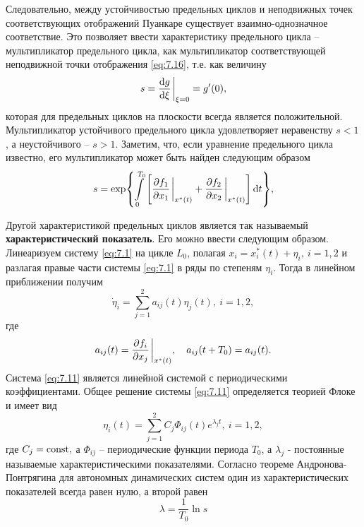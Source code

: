 Следовательно, между устойчивостью предельных циклов и
неподвижных точек соответствующих отображений Пуанкаре существует
взаимно-однозначное соответствие. Это позволяет ввести характеристику
предельного цикла -- мультипликатор предельного цикла, как мультипликатор
соответствующей неподвижной точки отображения \eqref{eq:7.16}, т.е. как величину
\begin{equation}
        \label{eq:7.9}
        s = \dv{g}{\xi} \eval_{\xi=0} = g'(0),
\end{equation}
которая для предельных циклов на плоскости всегда является положительной.
Мультипликатор устойчивого предельного цикла удовлетворяет неравенству
$s<1$, а неустойчивого -- $s>1$. Заметим, что, если уравнение предельного цикла
известно, его мультипликатор может быть найден следующим образом
\begin{equation}
        \label{eq:7.10}
        s= \exp{ \int\limits_{0}^{T_0} 
        \qty[\pdv{f_1}{x_1}\eval_{x^*(t)} +
        \pdv{f_2}{x_2}\eval_{x^*(t)}]\dd{t}}, 
\end{equation}

Другой характеристикой предельных циклов является так называемый \textbf{характеристический показатель}. Его можно ввести следующим образом. Линеаризуем систему \eqref{eq:7.1} на цикле $L_0$, полагая $x_i = x^*_i(t) + \eta_i, ~ i =1,2$
и разлагая правые части системы  \eqref{eq:7.1} в ряды по степеням $\eta_i$. Тогда в линейном приближении получим
\begin{equation}
        \label{eq:7.11}
        \dot \eta_i = \sum\limits_{j=1}^{2} a_{ij}(t) \eta_j(t), ~ i = 1,2,
\end{equation}
где 
\begin{equation}
        \label{eq:}
        a_{ij}(t) = \pdv{f_i}{x_j} \eval_{x^*(t)}, \quad a_{ij}(t+T_0)= a_{ij}(t).
\end{equation}
Система \eqref{eq:7.11} является линейной системой с периодическими коэффициентами. Общее решение системы \eqref{eq:7.11} определяется теорией Флоке и имеет вид
\begin{equation}
        \label{eq:}
        \eta_i(t) = \sum\limits_{j=1}^{2} C_j \Phi_{ij}(t) e^{\lambda_j t}, ~ i =1,2,
\end{equation}
где $C_j = \textrm{const},$ а $\Phi_{ij}$ -- периодические функции периода $T_0$, а $\lambda_j$ - постоянные называемые характеристическими показателями. Согласно теореме Андронова-Понтрягина 
для автономных динамических систем один из характеристических показателей всегда равен нулю, а второй равен
\begin{equation}
        \label{eq:7.13}
        \lambda = \frac{1}{T_0}\ln s
\end{equation}

